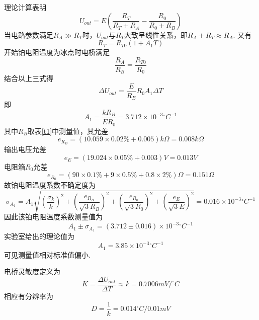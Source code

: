 \documentclass[12pt, a4paper]{ctexart}
\begin{document}
理论计算表明
\begin{equation*}
    U_{out} = E (\frac{R_T}{R_T + R_A} - \frac{R_0}{R_0 + R_B})
\end{equation*}
当电路参数满足$R_A \gg R_T$时，$U_{out}$与$R_T$大致呈线性关系，即$R_A + R_T \approx R_A$.
又有
\begin{equation*}
    R_T = R_{T0}(1 + A_1 T)
\end{equation*}
开始铂电阻温度为冰点时电桥满足
\begin{equation*}
    \frac{R_A}{R_B} = \frac{R_{T0}}{R_0}
\end{equation*}
结合以上三式得
\begin{equation*}
    \Delta U_{out} = \frac{E}{R_B}R_0 A_1 \Delta T
\end{equation*}
即
\begin{equation*}
    A_1 = \frac{k R_B}{E R_0} = 3.712 \times 10^{-3} {^{\circ} C}^{-1}
\end{equation*}
其中$R_B$取表\ref{t1}中测量值，其允差
\begin{equation*}
    e_{R_B} = (10.059 \times 0.02\% + 0.005)k\Omega = 0.008 k\Omega
\end{equation*}
输出电压允差
\begin{equation*}
    e_E = (19.024 \times 0.05\% + 0.003)V = 0.013 V
\end{equation*}
电阻箱$R_0$允差
\begin{equation*}
    e_{R_0} = (90 \times 0.1\% + 9 \times 0.5\% + 0.8 \times 2\%)\Omega = 0.151\Omega
\end{equation*}
故铂电阻温度系数不确定度为
\begin{equation*}
    \sigma_{A_1} = A_1 \sqrt{(\frac{\sigma_k}{k})^2 + (\frac{e_{R_B}}{\sqrt{3} R_B})^2 + (\frac{e_{R_0}}{\sqrt{3} R_0})^2 + (\frac{e_{E}}{\sqrt{3} E})^2} = 0.016 \times 10^{-3} {^{\circ}C}^{-1}
\end{equation*}
因此该铂电阻温度系数测量值为
\begin{equation*}
    A_1 \pm \sigma_{A_1} = (3.712 \pm 0.016)\times 10^{-3} {^{\circ}C}^{-1}
\end{equation*}
实验室给出的理论值为
\begin{equation*}
    A_1 = 3.85 \times 10^{-3} {^{\circ}C}^{-1}
\end{equation*}
可见测量值相对标准值偏小.

电桥灵敏度定义为
\begin{equation*}
    K = \frac{\Delta U_{out}}{\Delta T} \approx k = 0.7006 mV/^{\circ}C
\end{equation*}
相应有分辨率为
\begin{equation*}
    D = \frac{1}{k} = 0.014{^{\circ}C}/0.01mV
\end{equation*}
\end{document}
